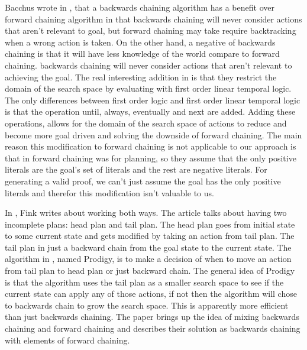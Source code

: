 \documentclass{article}
\begin{document}
Bacchus wrote in \cite{bacchus1995using}, that a backwards chaining algorithm has a benefit over forward chaining algorithm in that backwards chaining will never consider actions that aren't relevant to goal, but forward chaining may take require backtracking when a wrong action is taken. On the other hand, a negative of backwards chaining is that it will have less knowledge of the world compare to forward chaining.
backwards chaining will never consider actions that aren't relevant to achieving the goal. The real interesting addition in \cite{bacchus1995using} is that they restrict the domain of the search space by evaluating with first order linear temporal logic. The only differences between first order logic and first order linear temporal logic is that the operation until, always, eventually and next are added. Adding these operations, allows for the domain of the search space of actions to reduce and become more goal driven and solving the downside of forward chaining. The main reason this modification to forward chaining is not applicable to our approach is that in \cite{bacchus1995using} forward chaining was for planning, so they assume that the only positive literals are the goal's set of literals and the rest are negative literals. For generating a valid proof, we can't just assume the goal has the only positive literals and therefor this modification isn't valuable to us.

In \cite{fink1996formalizing}, Fink writes about working both ways. The article talks about having two incomplete plans: head plan and tail plan. The head plan goes from initial state to some current state and gets modified by taking an action from tail plan. The tail plan in just a backward chain from the goal state to the current state. The algorithm in \cite{fink1996formalizing}, named Prodigy, is to make a decision of when to move an action from tail plan to head plan or just backward chain. The general idea of Prodigy is that the algorithm uses the tail plan as a smaller search space to see if the current state can apply any of those actions, if not then the algorithm will chose to backwards chain to grow the search space. This is apparently more efficient than just backwards chaining. The paper brings up the idea of mixing backwards chaining and forward chaining and \cite{fink1996formalizing} describes their solution as backwards chaining with elements of forward chaining.




\end{document}
